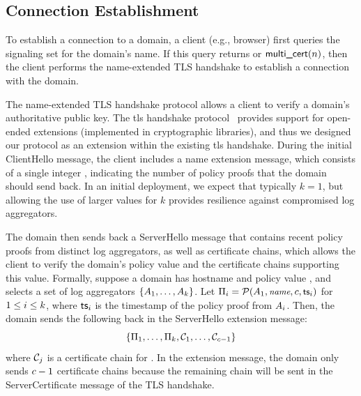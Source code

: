 \subsection{Connection Establishment}
\label{sec:design:handshake}


To establish a connection to a domain, a client (e.g., browser) first queries the 
signaling set for the domain's name.
If this query returns
\onecert or $\textsf{multi\_cert}(n)$, then the client performs the \ac{name}-extended
TLS handshake to establish a connection with the domain.

The \ac{name}-extended TLS handshake protocol allows a client to verify a domain's
authoritative public key. The \ac{tls} handshake protocol~\cite{rfc5246}
provides support for open-ended extensions (implemented in cryptographic
libraries), and thus we designed our protocol as an extension within the
existing \ac{tls} handshake. During the initial ClientHello message, the client
includes a \ac{name} extension message, which consists of a single integer
\numlas, indicating the number of policy proofs that the domain should send back.
In an initial deployment, we expect that typically $k=1$,
but allowing the use of larger values for $k$ provides resilience
against compromised log aggregators.

The domain then sends back a ServerHello message that contains \numlas recent
policy proofs from \numlas distinct log aggregators, as well as \numlas
certificate chains, which allows the client to verify the domain's policy value
and the certificate chains supporting this value. Formally, suppose a domain has
hostname \hostname and policy value \policy, and selects a set of log
aggregators $\{A_1, \ldots, A_k\}$. Let $\Pi_i =
\mathcal{P}(A_1, \small{\emph{name}}, c, \textsf{ts}_i)$ for $1 \le i \le
k$, where $\textsf{ts}_i$ is the timestamp of the policy proof from
$A_i$. Then, the domain sends the following back in the ServerHello
extension message:
\begin{equation}
  \{\Pi_1, \ldots, \Pi_k, \mathcal{C}_1,
  \ldots, \mathcal{C}_{c - 1}\}
\end{equation}
where $\mathcal{C}_j$ is a certificate chain for \hostname. In the extension
message, the domain only sends $c - 1$ certificate chains because the
remaining chain will be sent in the ServerCertificate message of the TLS
handshake.

